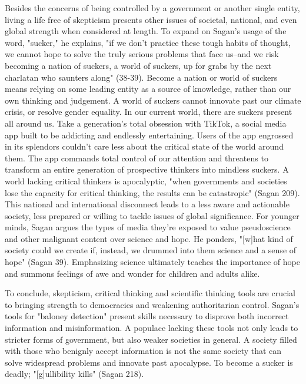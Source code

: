 \documentclass[12pt]{article}
\begin{document}
Besides the concerns of being controlled by a government or another single entity, living a life free of skepticism presents other
issues of societal, national, and even global strength when considered at length. To expand on Sagan's usage of the word, "sucker," he
explains, "if we don't practice these tough habits of thought, we cannot hope to solve the truly serious problems that face us–and we
risk becoming a nation of suckers, a world of suckers, up for grabs by the next charlatan who saunters along" (38-39). Become a nation or
world of suckers means relying on some leading entity as a source of knowledge, rather than our own thinking and judgement.
A world of suckers cannot innovate past our climate crisis, or resolve gender equality. In our current world, there are suckers present all around
us. Take a generation's total obsession with TikTok, a social media app built to be addicting and endlessly entertaining. Users of the app
engrossed in its splendors couldn't care less about the critical state of the world around them. 
The app commands total control of our attention and threatens to
transform an entire generation of prospective thinkers into mindless suckers. A world lacking critical thinkers is 
apocalyptic, "when governments and societies lose the capacity for critical thinking, the results can be catastropic" (Sagan 209).
This national and international disconnect leads to a less aware and actionable society, less prepared or willing to tackle
issues of global significance. For younger minds, Sagan argues the types of media they're exposed to value pseudoscience and
other malignant content over science and hope. He ponders, "[w]hat kind of society could we create if, instead, we drummed 
into them science and a sense of hope" (Sagan 39). Emphasizing science ultimately teaches the importance of hope and 
summons feelings of awe and wonder for children and adults alike.

To conclude, skepticism, critical thinking and scientific thinking tools are crucial to bringing strength to democracies and weakening authoritarian
control. Sagan's tools for "baloney detection" present skills necessary to disprove both incorrect information and misinformation.
A populace lacking these tools not only leads to stricter forms of government, but also weaker societies in general. A society filled with
those who benignly accept information is not the same society that can solve widespread problems and innovate past apocalypse.
To become a sucker is deadly; "[g]ullibility kills" (Sagan 218).
\end{document}
